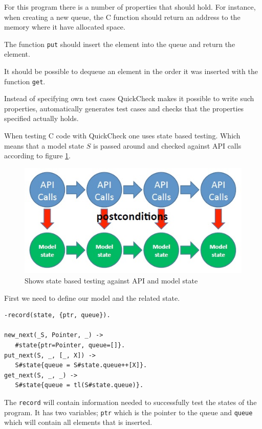 For this program there is a number of properties that should hold. For
instance, when creating a new queue, the C function should return an
address to the memory where it have allocated space.

The function \lstinline!put! should insert the element into the queue
and return the element.

It should be possible to dequeue an element in the order it was
inserted with the function \lstinline!get!.

Instead of specifying own test cases QuickCheck makes it possible to
write such properties, automatically generates test cases and checks
that the properties specified actually holds.

When testing C code with QuickCheck one uses state based
testing. Which means that a model state $S$ is passed around and
checked against API calls according to figure \ref{FIG:API_CALLS}.

\begin{figure}[!h]
  \includegraphics{pictures/api_calls.jpg}
  \caption{Shows state based testing against API and model state}
  \label{FIG:API_CALLS}
\end{figure}

First we need to define our model and the related state.
\begin{lstlisting}
-record(state, {ptr, queue}).

new_next(_S, Pointer, _) ->
   #state{ptr=Pointer, queue=[]}.
put_next(S, _, [_, X]) ->
   S#state{queue = S#state.queue++[X]}.
get_next(S, _, _) ->
   S#state{queue = tl(S#state.queue)}.
\end{lstlisting}

The \lstinline!record! will contain information needed to successfully
test the states of the program. It has two variables;
\lstinline!ptr! which is the pointer to the queue and
\lstinline!queue! which will contain all elements that is inserted.


